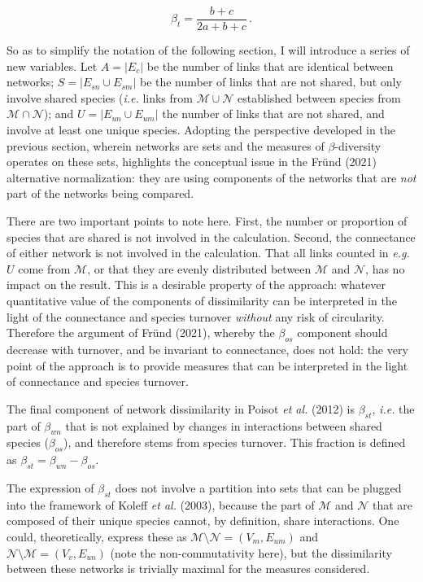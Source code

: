 \documentclass[11pt]{article}
\begin{document}
\[\beta_t = \frac{b+c}{2a+b+c}\,.\]

So as to simplify the notation of the following section, I will
introduce a series of new variables. Let \(A = |E_c|\) be the number of
links that are identical between networks; \(S = |E_{sn} \cup E_{sm}|\)
be the number of links that are not shared, but only involve shared
species (\emph{i.e.} links from \(\mathcal{M}\cup\mathcal{N}\)
established between species from \(\mathcal{M}\cap\mathcal{N}\)); and
\(U = |E_{un} \cup E_{um}|\) the number of links that are not shared,
and involve at least one unique species. Adopting the perspective
developed in the previous section, wherein networks are sets and the
measures of \(\beta\)-diversity operates on these sets, highlights the
conceptual issue in the Fründ (2021) alternative normalization: they are
using components of the networks that are \emph{not} part of the
networks being compared.

There are two important points to note here. First, the number or
proportion of species that are shared is not involved in the
calculation. Second, the connectance of either network is not involved
in the calculation. That all links counted in \emph{e.g.} \(U\) come
from \(\mathcal{M}\), or that they are evenly distributed between
\(\mathcal{M}\) and \(\mathcal{N}\), has no impact on the result. This
is a desirable property of the approach: whatever quantitative value of
the components of dissimilarity can be interpreted in the light of the
connectance and species turnover \emph{without} any risk of circularity.
Therefore the argument of Fründ (2021), whereby the \(\beta_{os}\)
component should decrease with turnover, and be invariant to
connectance, does not hold: the very point of the approach is to provide
measures that can be interpreted in the light of connectance and species
turnover.

The final component of network dissimilarity in Poisot \emph{et al.}
(2012) is \(\beta_{st}\), \emph{i.e.} the part of \(\beta_{wn}\) that is
not explained by changes in interactions between shared species
(\(\beta_{os}\)), and therefore stems from species turnover. This
fraction is defined as \(\beta_{st} = \beta_{wn}-\beta_{os}\).

The expression of \(\beta_{st}\) does not involve a partition into sets
that can be plugged into the framework of Koleff \emph{et al.} (2003),
because the part of \(\mathcal{M}\) and \(\mathcal{N}\) that are
composed of their unique species cannot, by definition, share
interactions. One could, theoretically, express these as
\(\mathcal{M} \setminus \mathcal{N} = (V_m, E_{um})\) and
\(\mathcal{N} \setminus \mathcal{M} = (V_v, E_{un})\) (note the
non-commutativity here), but the dissimilarity between these networks is
trivially maximal for the measures considered.
\end{document}
